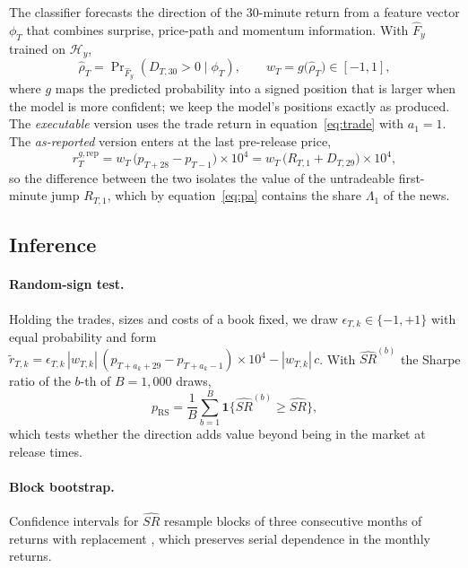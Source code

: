 The classifier forecasts the direction of the 30-minute return from a feature vector $\phi_T$
that combines surprise, price-path and momentum information. With $\hat F_y$ trained on
$\mathcal{H}_y$,
\begin{equation}\label{eq:ml}
  \hat\rho_T = \Pr\nolimits_{\hat F_y}\left(D_{T,30}>0 \mid \phi_T\right),\qquad
  w_T = g\big(\hat\rho_T\big)\in[-1,1],
\end{equation}
where $g$ maps the predicted probability into a signed position that is larger when the model is
more confident; we keep the model's positions exactly as produced. The \emph{executable} version
uses the trade return in equation~\eqref{eq:trade} with $a_1=1$. The \emph{as-reported} version
enters at the last pre-release price,
\begin{equation}\label{eq:asreported}
  r^{g,\text{rep}}_{T} = w_T\,\big(p_{T+28}-p_{T-1}\big)\times 10^4 = w_T\,\big(R_{T,1}+D_{T,29}\big)\times 10^4 ,
\end{equation}
so the difference between the two isolates the value of the untradeable first-minute jump
$R_{T,1}$, which by equation~\eqref{eq:pa} contains the share $\Lambda_1$ of the news.

\subsection{Inference}\label{sec:inference}

\paragraph{Random-sign test.} Holding the trades, sizes and costs of a book fixed, we draw
$\epsilon_{T,k}\in\{-1,+1\}$ with equal probability and form
$\tilde r_{T,k}=\epsilon_{T,k}\,|w_{T,k}|\,(p_{T+a_k+29}-p_{T+a_k-1})\times10^4-|w_{T,k}|\,c$. With
$\widehat{SR}^{(b)}$ the Sharpe ratio of the $b$-th of $B=1{,}000$ draws,
\begin{equation}\label{eq:randsign}
  p_{\text{RS}} = \frac{1}{B}\sum_{b=1}^{B}\mathbf{1}\big\{\widehat{SR}^{(b)}\ge\widehat{SR}\big\},
\end{equation}
which tests whether the direction adds value beyond being in the market at release times.

\paragraph{Block bootstrap.} Confidence intervals for $\widehat{SR}$ resample blocks of three
consecutive months of returns with replacement \citep{Kunsch1989}, which preserves serial
dependence in the monthly returns.

